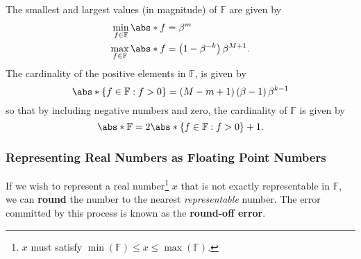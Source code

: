 \documentclass{article}
\begin{document}
\begin{corollary}
    The smallest and largest values (in magnitude) of \(\mathbb{F}\) are
    given by
    \begin{align*}
        \min_{f \in \mathbb{F}} \abs*{f} & = \beta^m                                      \\
        \max_{f \in \mathbb{F}} \abs*{f} & = \left( 1 - \beta^{-k} \right) \beta^{M + 1}.
    \end{align*}
    The cardinality of the positive elements in \(\mathbb{F}\), is given
    by
    \begin{equation*}
        \abs*{\left\{ f \in \mathbb{F} : f > 0 \right\}} = \left( M - m + 1 \right) \left( \beta - 1 \right) \beta^{k - 1}
    \end{equation*}
    so that by including negative numbers and zero, the cardinality of
    \(\mathbb{F}\) is given by
    \begin{equation*}
        \abs*{\mathbb{F}} = 2 \abs*{\left\{ f \in \mathbb{F} : f > 0 \right\}} + 1.
    \end{equation*}
\end{corollary}
\subsubsection{Representing Real Numbers as Floating Point Numbers}
If we wish to represent a real number\footnote{\(x\) must satisfy
\(\min{\left( \mathbb{F} \right)} \leq x \leq \max{\left( \mathbb{F}
\right)}\).} \(x\) that is not exactly representable in \(\mathbb{F}\),
we can \textbf{round} the number to the nearest \textit{representable}
number. The error committed by this process is known as the
\textbf{round-off error}.
\end{document}
